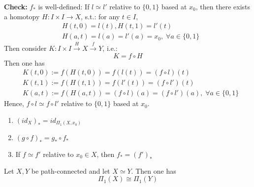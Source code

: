 \noindent\textbf{Check:} $f_*$ is well-defined: If $l \simeq l'$ relative to $\{ 0,1 \}$ based at $x_0$, then there exists a homotopy $H : I \times I \rightarrow X$, s.t.: for any $t \in I$,
\begin{align*}
    &H(t,0) =l(t), H(t,1)=l'(t)\\
    &H(a,t) = l(a) = l'(a) =x_0, \;\forall a \in \{0,1\}
\end{align*}
Then consider $K: I \times I \overset{H}{\rightarrow} X \overset{f}{\rightarrow} Y$, i.e.:
$$K = f \circ H$$
Then one has
\begin{align*}
    &K(t,0) := f(H(t,0)) = f(l(t)) = (f \circ l) (t)\\
    &K(t,1) := f(H(t,1)) = f(l'(t)) = (f \circ l') (t)\\
    &K(a,t) := f(H(a,t)) =(f \circ l)(a) = (f \circ l')(a),\; \forall a\in \{0,1\}
\end{align*}
Hence, $f \circ l \simeq f \circ l'$ relative to $\{0,1\}$ based at $x_0$.

\begin{proposition}
    \begin{enumerate}
        \item $(id_X)_* = id_{\Pi_1(X,x_0)}$
        \item $(g \circ f)_* = g_* \circ f_*$
        \item If $f \simeq f'$ relative to $x_0 \in X$, then $f_* = (f')_*$
    \end{enumerate}
\end{proposition}

\begin{corollary}
    Let $X,Y$ be path-connected and let $X \simeq Y$. Then one has
    $$\Pi_1 (X) \cong \Pi_1(Y)$$
\end{corollary}

